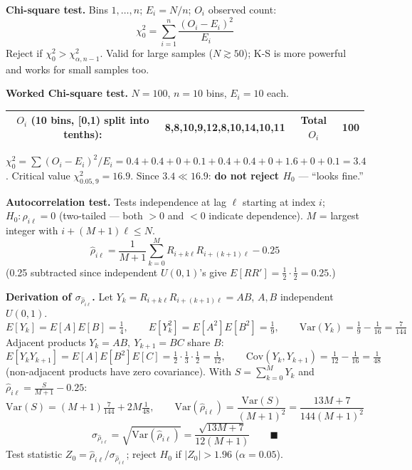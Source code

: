\textbf{Chi-square test.} Bins $1,\dots,n$; $E_i=N/n$; $O_i$ observed count:
\[
\chi_0^2 = \sum_{i=1}^n\frac{(O_i-E_i)^2}{E_i}
\]
Reject if $\chi_0^2>\chi^2_{\alpha,n-1}$. Valid for large samples ($N\gtrsim50$); K-S is more powerful and works for small samples too.

\begin{examplebox}
\textbf{Worked Chi-square test.} $N=100$, $n=10$ bins, $E_i=10$ each.
\begin{center}\small
\begin{tabular}{@{}cc|cc@{}}
\toprule
$O_i$ (10 bins, [0,1) split into tenths): & 8,8,10,9,12,8,10,14,10,11 & Total $O_i$ & 100\\
\bottomrule
\end{tabular}
\end{center}
$\chi_0^2=\sum(O_i-E_i)^2/E_i = 0.4{+}0.4{+}0{+}0.1{+}0.4{+}0.4{+}0{+}1.6{+}0{+}0.1=3.4$. Critical value $\chi^2_{0.05,9}=16.9$. Since $3.4\ll16.9$: \textbf{do not reject $H_0$} — ``looks fine.''
\end{examplebox}

\textbf{Autocorrelation test.} Tests independence at lag $\ell$ starting at index $i$; $H_0:\rho_{i\ell}=0$ (two-tailed — both $>0$ and $<0$ indicate dependence). $M$ = largest integer with $i+(M{+}1)\ell\le N$.
\[
\hat\rho_{i\ell} = \frac{1}{M+1}\sum_{k=0}^M R_{i+k\ell}R_{i+(k+1)\ell} - 0.25
\]
(0.25 subtracted since independent $U(0,1)$'s give $E[RR']=\tfrac12\cdot\tfrac12=0.25$.)

\begin{examplebox}
\textbf{Derivation of $\sigma_{\hat\rho_{i\ell}}$.} Let $Y_k=R_{i+k\ell}R_{i+(k+1)\ell}=AB$, $A,B$ independent $U(0,1)$.
\[
E[Y_k]=E[A]E[B]=\tfrac14, \qquad E[Y_k^2]=E[A^2]E[B^2]=\tfrac19, \qquad \mathrm{Var}(Y_k)=\tfrac19-\tfrac1{16}=\tfrac{7}{144}
\]
Adjacent products $Y_k=AB,\ Y_{k+1}=BC$ share $B$:
\[
E[Y_kY_{k+1}] = E[A]E[B^2]E[C] = \tfrac12\cdot\tfrac13\cdot\tfrac12=\tfrac1{12}, \qquad \mathrm{Cov}(Y_k,Y_{k+1}) = \tfrac1{12}-\tfrac1{16}=\tfrac1{48}
\]
(non-adjacent products have zero covariance). With $S=\sum_{k=0}^M Y_k$ and $\hat\rho_{i\ell}=\frac{S}{M+1}-0.25$:
\[
\mathrm{Var}(S) = (M{+}1)\tfrac{7}{144} + 2M\tfrac1{48}, \qquad \mathrm{Var}(\hat\rho_{i\ell}) = \frac{\mathrm{Var}(S)}{(M+1)^2} = \frac{13M+7}{144(M+1)^2}
\]
\[
\sigma_{\hat\rho_{i\ell}} = \sqrt{\mathrm{Var}(\hat\rho_{i\ell})} = \frac{\sqrt{13M+7}}{12(M+1)} \qquad\blacksquare
\]
Test statistic $Z_0 = \hat\rho_{i\ell}/\sigma_{\hat\rho_{i\ell}}$; reject $H_0$ if $|Z_0|>1.96$ ($\alpha=0.05$).
\end{examplebox}

